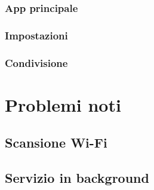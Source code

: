 \documentclass[11pt]{article}
\begin{document}
\subsubsection{App principale}
\subsubsection{Impostazioni}
\subsubsection{Condivisione}



\section{Problemi noti}

\subsection{Scansione Wi-Fi}
\subsection{Servizio in background}
\end{document}
